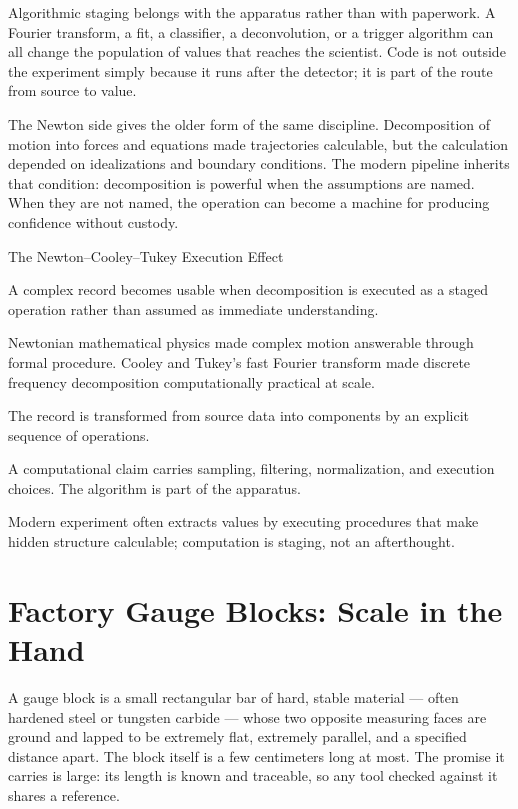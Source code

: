 Algorithmic staging belongs with the apparatus rather than with paperwork. A
Fourier transform, a fit, a classifier, a deconvolution, or a trigger
algorithm can all change the population of values that reaches the
scientist. Code is not outside the experiment simply because it runs after
the detector; it is part of the route from source to value.

The Newton side gives the older form of the same discipline. Decomposition of
motion into forces and equations made trajectories calculable, but the
calculation depended on idealizations and boundary conditions. The modern
pipeline inherits that condition: decomposition is powerful when the
assumptions are named. When they are not named, the operation can become a
machine for producing confidence without custody.

\begin{phenom}{The Newton--Cooley--Tukey Execution Effect~\cite{newton1687,cooley1965}}
\label{ph:newton-cooley-tukey-execution}

\PhStatement
A complex record becomes usable when decomposition is executed as a staged
operation rather than assumed as immediate understanding.

\PhOrigin
Newtonian mathematical physics made complex motion answerable through
formal procedure. Cooley and Tukey's fast Fourier transform made discrete
frequency decomposition computationally practical at scale.

\PhObservation
The record is transformed from source data into components by an explicit
sequence of operations.

\PhConstraint
A computational claim carries sampling, filtering, normalization, and
execution choices. The algorithm is part of the apparatus.

\PhConsequence
Modern experiment often extracts values by executing procedures that make
hidden structure calculable; computation is staging, not an afterthought.
\end{phenom}

\section{Factory Gauge Blocks: Scale in the Hand}

A gauge block is a small rectangular bar of hard, stable material --- often
hardened steel or tungsten carbide --- whose two opposite measuring faces
are ground and lapped to be extremely flat, extremely parallel, and a
specified distance apart. The block itself is a few centimeters long at
most. The promise it carries is large: its length is known and traceable,
so any tool checked against it shares a reference.

